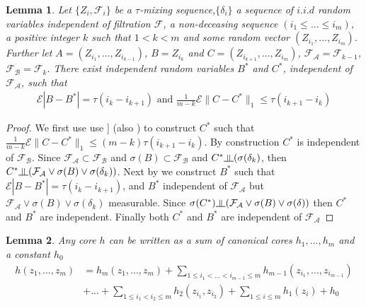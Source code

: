 \documentclass{article} %
\newtheorem{lemma}{Lemma}
\newcommand{\indep}{\rotatebox[origin=c]{90}{$\models$}}
\newcommand{\ev}{\mathcal{E}}
\begin{document}
\begin{lemma}
\label{lem:complicated}
Let $\{Z_i,\mathcal{F}_i\}$ be a $\tau$-mixing sequence,$\{ \delta_i \}$ a sequence of $i.i.d$ random variables independent of filtration $\mathcal{F}$, a non-deceasing sequence $(i_1\leq ... \leq i_m)$, a positive integer $k$ such that $1 < k<m$ and some random vector $(Z_{i_1},...,Z_{i_m})$. Further let $A = (Z_{i_1},...,Z_{i_{k-1}})$, $B= Z_{i_k}$ and $C=(Z_{i_{k+1}},...,Z_{i_{m}})$,  $\mathcal{F_A} =\mathcal{F}_{k-1}$, $\mathcal{F_B}  =\mathcal{F}_{k}$. There exist independent random variables $B^*$ and $C^*$, independent of $\mathcal{F_A}$, such that  
\begin{align}
\ev |B-B^*| = \tau(i_{k} -i_{k+1}) \text{ and } \frac{1} {m-k} \ev \parallel C-C^* \parallel_1 \leq \tau(i_{k+1}-i_k) 
\end{align}    
\end{lemma}


\begin{proof}
We first use use  \cite[Equation 2.1]{leucht_dependent_2013}] (also \cite[Lemma 5.3]{dedecker2007weak}) to construct $C^*$ such that $\frac{1} {m-k}  \ev \parallel C-C^* \parallel_1 \leq (m-k) \tau(i_{k+1}-i_k)$. By construction $C^*$ is independent of $\mathcal{F_B}$. Since $ \mathcal{F_A} \subset \mathcal{F_B}$ and $ \sigma(B) \subset \mathcal{F_B}$ and $C^* \indep (\sigma(\delta_k) $, then $C^* \indep  (\mathcal{F_A} \vee \sigma(B)  \vee \sigma(\delta_k)  )$. Next by \cite[Lemma 5.2]{dedecker2007weak} we construct $B^*$  such  that $\ev |B-B^*| = \tau(i_{k} -i_{k+1})$, and $B^*$  independent  of $\mathcal{F_A}$ but $\mathcal{F_A} \vee \sigma(B) \vee \sigma(\delta_k)$ measurable. Since   $\sigma(C^*) \indep (\mathcal{F_A} \vee \sigma(B) \vee \sigma(\delta)) $ then $C^*$ and $B^*$ are independent. Finally both $C^*$ and $B^*$ are independent of $\mathcal{F_A}$   
\end{proof}

\begin{lemma}
\label{lem:Components}\cite[Section 5.1.5]{serfling80}
Any core $h$ can be written as a sum of canonical cores $h_1,...,h_m$ and a constant $h_0$
\begin{align*}
h(z_1,...,z_m) &=   h_m(z_1,...,z_m) + \sum_{1 \leq i_1 < ...<i_{m-1} \leq m } h_{m-1}(z_{i_1},...,z_{i_{m-1}}) \\ 
    & + ... + \sum_{1 \leq i_1 < i_2 \leq m } h_2(z_{i_1},z_{i_2}) + \sum_{1 \leq i \leq m} h_1(z_i)+h_0
\end{align*} 
\end{lemma}
\end{document}
